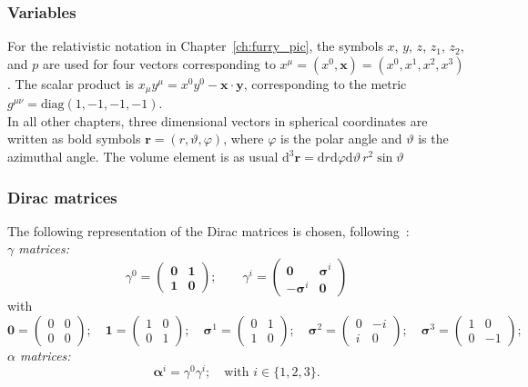 \subsubsection*{Variables}
For the relativistic notation in Chapter~\ref{ch:furry_pic}, the symbols $x$, $y$, $z$, $z_1$, $z_2$, and $p$ are used for four vectors corresponding to $x^\mu=(x^0,\mathbf{x})=(x^0,x^1,x^2,x^3)$. The scalar product is $x_\mu y^\mu = x^0 y^0 - \mathbf{x}\cdot\mathbf{y}$, corresponding to the metric $g^{\mu\nu}=\text{diag}(1,-1,-1,-1)$.\\
In all other chapters, three dimensional vectors in spherical coordinates are written as bold symbols $\mathbf{r}=(r,\vartheta,\varphi)$, where $\varphi$ is the polar angle and $\vartheta$ is the azimuthal angle. The volume element is as usual $\text{d}^3\mathbf{r}=\text{d}r\text{d}\varphi\text{d}\vartheta\, r^2 \sin\vartheta $
\subsubsection*{Dirac matrices}
The following representation of the Dirac matrices is chosen, following~\cite{peskin1995}:\\
\textit{$\gamma$ matrices:}
\begin{equation}
\gamma^0 =
\begin{pmatrix}
\boldsymbol{0}&\boldsymbol{1}\\
\boldsymbol{1}&\boldsymbol{0}
\end{pmatrix};\qquad
\gamma^{i} = 
\begin{pmatrix}
\boldsymbol{0}&\boldsymbol{\sigma}^i\\
-\boldsymbol{\sigma}^i&\boldsymbol{0}
\end{pmatrix}
\end{equation}
with
\begin{equation}
\boldsymbol{0}=
\begin{pmatrix}
0&0\\0&0
\end{pmatrix};\quad
\boldsymbol{1}=
\begin{pmatrix}
1&0\\0&1
\end{pmatrix};\quad
\boldsymbol{\sigma}^1=
\begin{pmatrix}
0&1\\1&0
\end{pmatrix};\quad
\boldsymbol{\sigma}^2=
\begin{pmatrix}
0&-i\\i&0
\end{pmatrix};\quad
\boldsymbol{\sigma}^3=
\begin{pmatrix}
1&0\\0&-1
\end{pmatrix};\quad
\end{equation}
\textit{$\alpha$ matrices:}
\begin{equation}
\boldsymbol{\alpha}^i = \gamma^0 \gamma^i;\quad\text{with }i \in \{1,2,3\}.
\end{equation}

